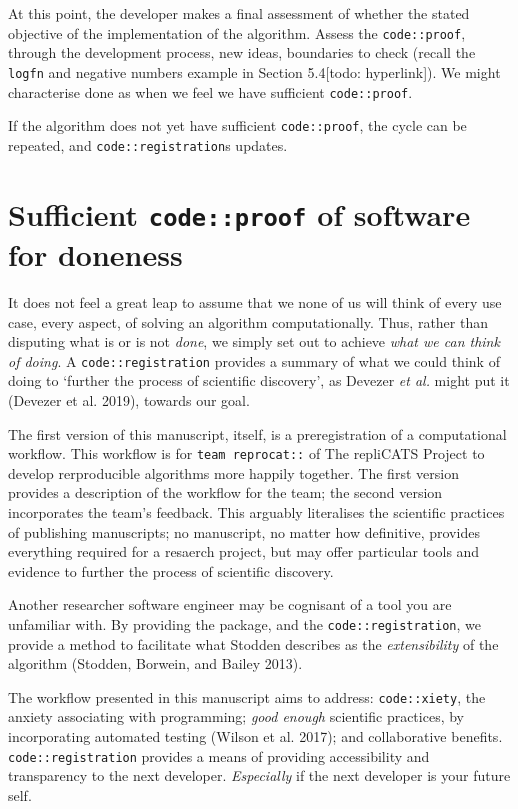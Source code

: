 \documentclass[
]{article}
\begin{document}
At this point, the developer makes a final assessment of whether the
stated objective of the implementation of the algorithm. Assess the
\texttt{code::proof}, through the development process, new ideas,
boundaries to check (recall the \texttt{logfn} and negative numbers
example in Section 5.4{[}todo: hyperlink{]}). We might characterise done
as when we feel we have sufficient \texttt{code::proof}.

If the algorithm does not yet have sufficient \texttt{code::proof}, the
cycle can be repeated, and \texttt{code::registration}s updates.

\hypertarget{sufficient-codeproof-of-software-for-doneness}{%
\section{\texorpdfstring{Sufficient \texttt{code::proof} of software for
doneness}{Sufficient code::proof of software for doneness}}\label{sufficient-codeproof-of-software-for-doneness}}

It does not feel a great leap to assume that we none of us will think of
every use case, every aspect, of solving an algorithm computationally.
Thus, rather than disputing what is or is not \emph{done}, we simply set
out to achieve \emph{what we can think of doing}. A
\texttt{code::registration} provides a summary of what we could think of
doing to `further the process of scientific discovery', as Devezer
\emph{et al.} might put it (Devezer et al. 2019), towards our goal.

The first version of this manuscript, itself, is a preregistration of a
computational workflow. This workflow is for \texttt{team\ reprocat::}
of The repliCATS Project to develop rerproducible algorithms more
happily together. The first version provides a description of the
workflow for the team; the second version incorporates the team's
feedback. This arguably literalises the scientific practices of
publishing manuscripts; no manuscript, no matter how definitive,
provides everything required for a resaerch project, but may offer
particular tools and evidence to further the process of scientific
discovery.

Another researcher software engineer may be cognisant of a tool you are
unfamiliar with. By providing the package, and the
\texttt{code::registration}, we provide a method to facilitate what
Stodden describes as the \emph{extensibility} of the algorithm (Stodden,
Borwein, and Bailey 2013).

The workflow presented in this manuscript aims to address:
\texttt{code::xiety}, the anxiety associating with programming;
\emph{good enough} scientific practices, by incorporating automated
testing (Wilson et al. 2017); and collaborative benefits.
\texttt{code::registration} provides a means of providing accessibility
and transparency to the next developer. \emph{Especially} if the next
developer is your future self.
\end{document}
